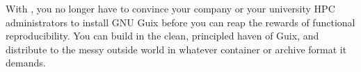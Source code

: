 With , you no longer have to convince your company or your university HPC administrators to install GNU Guix before you can reap the rewards of functional reproducibility. You can build in the clean, principled haven of Guix, and distribute to the messy outside world in whatever container or archive format it demands.
